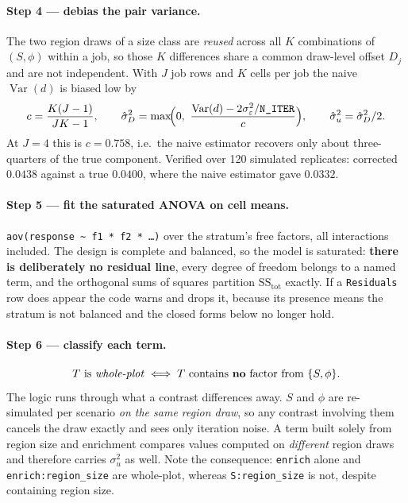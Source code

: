 \paragraph{Step 4 --- debias the pair variance.}
The two region draws of a size class are \emph{reused} across all
$K$ combinations of $(S,\phi)$ within a job, so those $K$ differences share a
common draw-level offset $D_j$ and are not independent. With $J$ job rows and
$K$ cells per job the naive $\operatorname{Var}(d)$ is biased low by
\[
c=\frac{K(J-1)}{JK-1},
\qquad
\hat\sigma^2_D=\max\!\Bigl(0,\ \frac{\operatorname{Var}(d)-2\sigma^2_\varepsilon/\texttt{N\_ITER}}{c}\Bigr),
\qquad
\hat\sigma^2_u=\hat\sigma^2_D/2 .
\]
At $J=4$ this is $c=0.758$, i.e.\ the naive estimator recovers only about
three-quarters of the true component. Verified over 120 simulated replicates:
corrected $0.0438$ against a true $0.0400$, where the naive estimator gave
$0.0332$.

\paragraph{Step 5 --- fit the saturated ANOVA on cell means.}
\texttt{aov(response \textasciitilde{} f1 * f2 * \ldots)} over the stratum's free
factors, all interactions included. The design is complete and balanced, so the
model is saturated: \textbf{there is deliberately no residual line}, every degree
of freedom belongs to a named term, and the orthogonal sums of squares partition
$\mathrm{SS}_{\text{tot}}$ exactly. If a \texttt{Residuals} row does appear the
code warns and drops it, because its presence means the stratum is not balanced
and the closed forms below no longer hold.

\paragraph{Step 6 --- classify each term.}
\[
T \text{ is \emph{whole-plot}} \iff T \text{ contains \textbf{no} factor from } \{S,\phi\}.
\]
The logic runs through what a contrast differences away. $S$ and $\phi$ are
re-simulated per scenario \emph{on the same region draw}, so any contrast
involving them cancels the draw exactly and sees only iteration noise. A term
built solely from region size and enrichment compares values computed on
\emph{different} region draws and therefore carries $\sigma^2_u$ as well. Note
the consequence: \texttt{enrich} alone and
\texttt{enrich:region\_size} are whole-plot, whereas \texttt{S:region\_size} is
not, despite containing region size.

